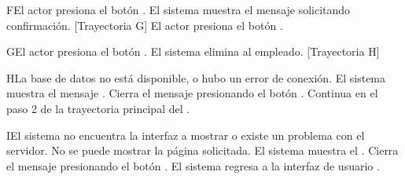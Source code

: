 \begin{UCtrayectoriaA}{F}{El actor presiona el botón .}
    \UCpaso El sistema muestra el mensaje  solicitando confirmación. [Trayectoria G]
    \UCpaso[\UCactor] El actor presiona el botón .
\end{UCtrayectoriaA}

\begin{UCtrayectoriaA}{G}{El actor presiona el botón .}
    \UCpaso     El sistema elimina al empleado. [Trayectoria H]   
\end{UCtrayectoriaA}


\begin{UCtrayectoriaA}{H}{La base de datos no está disponible, o hubo un error de conexión.}
    \UCpaso El sistema muestra el mensaje .
    \UCpaso[\UCactor] Cierra el mensaje presionando el botón .
    \UCpaso Continua en el paso 2 de la trayectoria principal del .
\end{UCtrayectoriaA}


\begin{UCtrayectoriaA}{I}{El sistema no encuentra la interfaz a mostrar o existe un problema con el servidor.}
    \UCpaso No se puede mostrar la página solicitada.
    \UCpaso El sistema muestra el .
    \UCpaso[\UCactor] Cierra el mensaje presionando el botón .
    \UCpaso El sistema regresa a la interfaz de usuario .
\end{UCtrayectoriaA}

